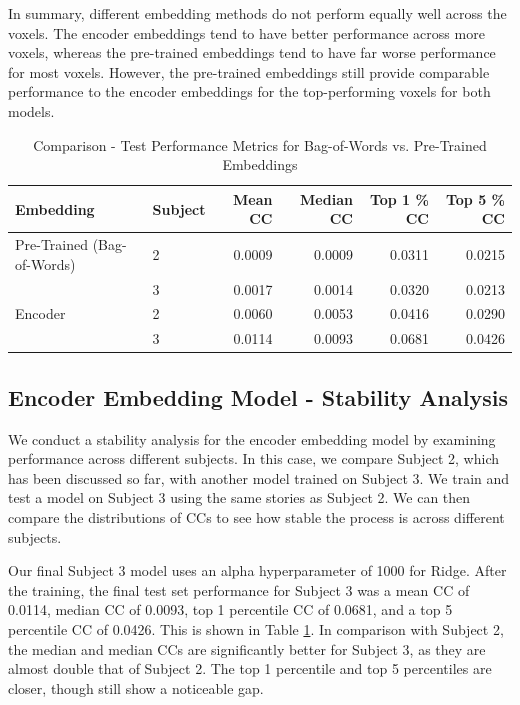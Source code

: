 \documentclass[10pt,letterpaper]{article}
\begin{document}
In summary, different embedding methods do not perform equally well across the voxels. The encoder embeddings tend to have better performance across more voxels, whereas the pre-trained embeddings tend to have far worse performance for most voxels. However, the pre-trained embeddings still provide comparable performance to the encoder embeddings for the top-performing voxels for both models.


\begin{table}[ht]
\centering
\caption{Comparison - Test Performance Metrics for Bag-of-Words vs. Pre-Trained Embeddings}
\label{tab:cc_pretrained_vs_encoder_comparison}
\begin{tabular}{llrrrr}
\toprule
\textbf{Embedding}   & \textbf{Subject} & \textbf{Mean CC} & \textbf{Median CC} & \textbf{Top 1 \% CC} & \textbf{Top 5 \% CC} \\
\midrule
Pre-Trained (Bag-of-Words) & 2 & 0.0009 & 0.0009 & 0.0311 & 0.0215 \\
             & 3 & 0.0017 & 0.0014 & 0.0320 & 0.0213 \\
\addlinespace
Encoder      & 2 & 0.0060 & 0.0053 & 0.0416 & 0.0290 \\
             & 3 & 0.0114 & 0.0093 & 0.0681 & 0.0426 \\
\bottomrule
\end{tabular}
\end{table}


\subsection{Encoder Embedding Model - Stability Analysis}
We conduct a stability analysis for the encoder embedding model by examining performance across different subjects. In this case, we compare Subject 2, which has been discussed so far, with another model trained on Subject 3. We train and test a model on Subject 3 using the same stories as Subject 2. We can then compare the distributions of CCs to see how stable the process is across different subjects.

Our final Subject 3 model uses an alpha hyperparameter of 1000 for Ridge. After the training, the final test set performance for Subject 3 was a mean CC of 0.0114, median CC of 0.0093, top 1 percentile CC of 0.0681, and a top 5 percentile CC of 0.0426. This is shown in Table \ref{tab:cc_pretrained_vs_encoder_comparison}. In comparison with Subject 2, the median and median CCs are significantly better for Subject 3, as they are almost double that of Subject 2. The top 1 percentile and top 5 percentiles are closer, though still show a noticeable gap.
\end{document}
